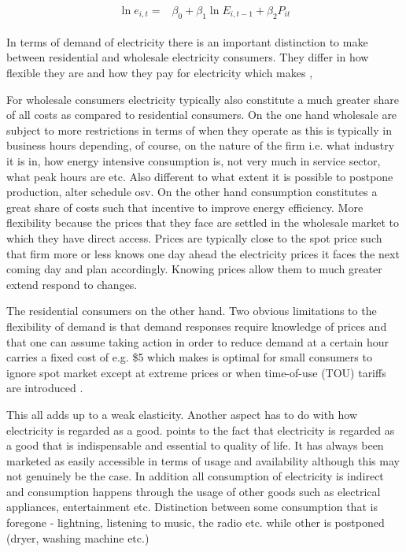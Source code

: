 \begin{align}
  \begin{split}
  \ln e_{i,t}= &\beta_0 + \beta_1 \ln E_{i,t-1} + \beta_2 P_{it} 
  \end{split}
\end{align}


In terms of demand of electricity there is an important distinction to make between residential and wholesale electricity consumers. They differ in how flexible they are and how they pay for electricity which makes , 

For wholesale consumers electricity typically also constitute a much greater share of all costs as compared to residential consumers. 
On the one hand wholesale are subject to more restrictions in terms of when they operate as this is typically in business hours depending, of course, on the nature of the firm i.e. what industry it is in, how energy intensive consumption is, not very much in service sector, what peak hours are etc. Also different to what extent it is possible to postpone production, alter schedule osv. On the other hand consumption constitutes a great share of costs such that incentive to improve energy efficiency. More flexibility because the prices that they face are settled in the wholesale market to which they have direct access. Prices are typically close to the spot price such that firm more or less knows one day ahead the electricity prices it faces the next coming day and plan accordingly. Knowing prices allow them to much greater extend respond to changes. 

The residential consumers on the other hand. 
Two obvious limitations to the flexibility of demand is that demand responses require knowledge of prices and that one can assume taking action in order to reduce demand at a certain hour carries a fixed cost of e.g. \$5 which makes is optimal for small consumers to ignore spot market except at extreme prices or when time-of-use (TOU) tariffs are introduced \citep{wolak2011residential}. 

This all adds up to a weak elasticity. Another aspect has to do with how electricity is regarded as a good. \citep{kirschen2003demand} points to the fact that electricity is regarded as a good that is indispensable and essential to quality of life. It has always been marketed as easily accessible in terms of usage and availability although this may not genuinely be the case. In addition all consumption of electricity is indirect and consumption happens through the usage of other goods such as electrical appliances, entertainment etc. Distinction between some consumption that is foregone - lightning, listening to music, the radio etc. while other is postponed (dryer, washing machine etc.) 


